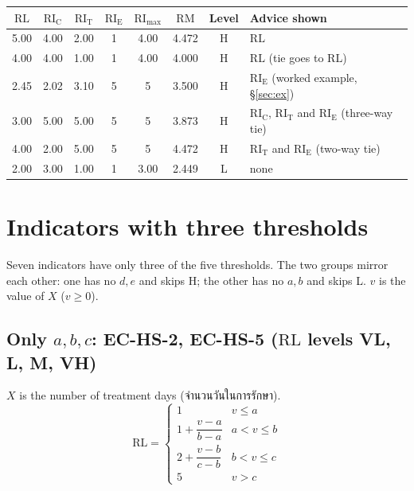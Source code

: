 \documentclass[10pt,a4paper]{article}
\newcommand{\RL}{\mathrm{RL}}\newcommand{\RIC}{\mathrm{RI_C}}\newcommand{\RIT}{\mathrm{RI_T}}\newcommand{\RIE}{\mathrm{RI_E}}
\newcommand{\RImax}{\mathrm{RI}_{\max}}\newcommand{\RM}{\mathrm{RM}}
\begin{document}
\begin{center}\small
\renewcommand{\arraystretch}{1.2}
\begin{tabular}{@{}cccc c c c l@{}}
\toprule
$\RL$ & $\RIC$ & $\RIT$ & $\RIE$ & $\RImax$ & $\RM$ & Level & Advice shown\\\midrule
5.00 & 4.00 & 2.00 & 1 & 4.00 & 4.472 & H & $\RL$\\
4.00 & 4.00 & 1.00 & 1 & 4.00 & 4.000 & H & $\RL$ (tie goes to $\RL$)\\
2.45 & 2.02 & 3.10 & 5 & 5 & 3.500 & H & $\RIE$ (worked example, §\ref{sec:ex})\\
3.00 & 5.00 & 5.00 & 5 & 5 & 3.873 & H & $\RIC$, $\RIT$ and $\RIE$ (three-way tie)\\
4.00 & 2.00 & 5.00 & 5 & 5 & 4.472 & H & $\RIT$ and $\RIE$ (two-way tie)\\
2.00 & 3.00 & 1.00 & 1 & 3.00 & 2.449 & L & none\\
\bottomrule
\end{tabular}
\end{center}

\section{Indicators with three thresholds}\label{sec:hs}
Seven indicators have only three of the five thresholds. The two groups mirror each other: one has no $d,e$ and skips H; the other has no $a,b$ and skips L. $v$ is the value of $X$ ($v\ge0$).

\subsection*{Only $a,b,c$: EC-HS-2, EC-HS-5 \quad ($\RL$ levels VL, L, M, VH)}
$X$ is the number of treatment days (จำนวนวันในการรักษา).
\[
\RL=\begin{cases}
1 & v\le a\\[2pt]
1+\dfrac{v-a}{b-a} & a<v\le b\\[8pt]
2+\dfrac{v-b}{c-b} & b<v\le c\\[8pt]
5 & v>c
\end{cases}
\]
\end{document}
